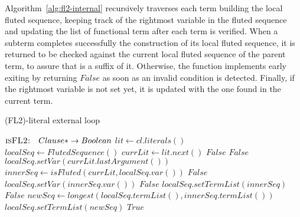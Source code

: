 Algorithm~\ref{alg:fl2-internal} recursively traverses each term building the local fluted sequence, keeping track of the rightmost variable in the fluted sequence and updating the list of functional term after each term is verified.
When a subterm completes successfully the construction of its local fluted sequence, it is returned to be checked against the current local fluted sequence of the parent term, to assure that is a suffix of it.
Otherwise, the function implements early exiting by returning \(False\) as soon as an invalid condition is detected.
Finally, if the rightmost variable is not set yet, it is updated with the one found in the current term.

\begin{algorithm}[H]
  \caption{(FL2)-literal external loop}\label{alg:fl2-external}
  \begin{algorithmic}[1]
      \Statex{}  \(\textsc{isFL2:} \quad Clause* \to Boolean\)
        \State{} \(lit \gets cl.literals()\)
        \State{} \(localSeq \gets FlutedSequence()\)
          \State{} \(currLit \gets lit.next()\)
            \State{} \Return{} \(False\)
          \EndIf{}
              \State{} \Return{} \(False\)
            \Else{}
              \State{} \(localSeq.setVar(currLit.lastArgument())\)
            \EndIf{}
          \Else{}
            \State{} \(innerSeq \gets isFluted(currLit, localSeq.var())\)
              \State{} \Return{} \(False\)
            \EndIf{}
              \State{} \(localSeq.setVar(innerSeq.var())\)
              \State{} \Return{} \(False\)
            \EndIf{}
              \State{} \(localSeq.setTermList(innerSeq)\)
            \Else{}
                \State{} \Return{} \(False\)
              \Else{}
                \State{} \(newSeq \gets longest(localSeq.termList(), innerSeq.termList())\)
                \State{} \(localSeq.setTermList(newSeq)\)
              \EndIf{}
            \EndIf{}
          \EndIf{}
        \EndWhile{}
        \State{} \Return{} \(True\)
      \EndFunction{}
  \end{algorithmic}
\end{algorithm}

